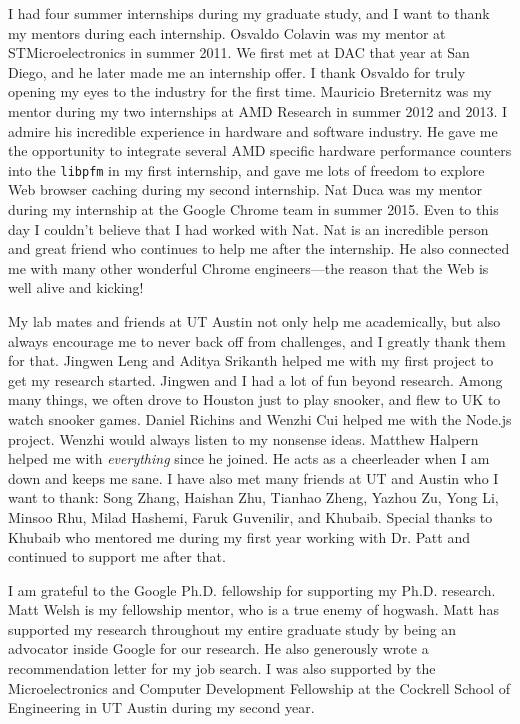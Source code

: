 \begin{acknowledgments}
I had four summer internships during my graduate study, and I want to thank my mentors during each internship. Osvaldo Colavin was my mentor at STMicroelectronics in summer 2011. We first met at DAC that year at San Diego, and he later made me an internship offer. I thank Osvaldo for truly opening my eyes to the industry for the first time. Mauricio Breternitz was my mentor during my two internships at AMD Research in summer 2012 and 2013. I admire his incredible experience in hardware and software industry. He gave me the opportunity to integrate several AMD specific hardware performance counters into the \texttt{libpfm} in my first internship, and gave me lots of freedom to explore Web browser caching during my second internship. Nat Duca was my mentor during my internship at the Google Chrome team in summer 2015. Even to this day I couldn't believe that I had worked with Nat. Nat is an incredible person and great friend who continues to help me after the internship. He also connected me with many other wonderful Chrome engineers---the reason that the Web is well alive and kicking!

My lab mates and friends at UT Austin not only help me academically, but also always encourage me to never back off from challenges, and I greatly thank them for that. Jingwen Leng and Aditya Srikanth helped me with my first project to get my research started. Jingwen and I had a lot of fun beyond research. Among many things, we often drove to Houston just to play snooker, and flew to UK to watch snooker games. Daniel Richins and Wenzhi Cui helped me with the Node.js project. Wenzhi would always listen to my nonsense ideas. Matthew Halpern helped me with \textit{everything} since he joined. He acts as a cheerleader when I am down and keeps me sane. I have also met many friends at UT and Austin who I want to thank: Song Zhang, Haishan Zhu, Tianhao Zheng, Yazhou Zu, Yong Li, Minsoo Rhu, Milad Hashemi, Faruk Guvenilir, and Khubaib. Special thanks to Khubaib who mentored me during my first year working with Dr. Patt and continued to support me after that.

I am grateful to the Google Ph.D. fellowship for supporting my Ph.D. research. Matt Welsh is my fellowship mentor, who is a true enemy of hogwash. Matt has supported my research throughout my entire graduate study by being an advocator inside Google for our research. He also generously wrote a recommendation letter for my job search. I was also supported by the Microelectronics and Computer Development Fellowship at the Cockrell School of Engineering in UT Austin during my second year.


\end{acknowledgments}
